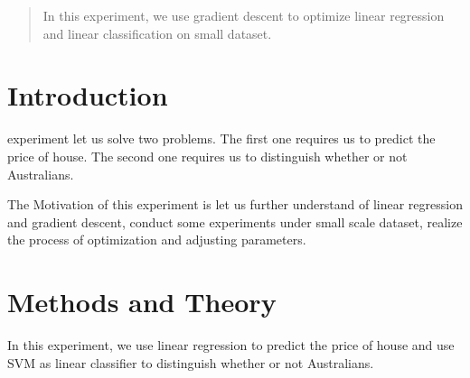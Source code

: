 \documentclass[journal, a4paper]{IEEEtran}
\begin{document}
\begin{abstract}
    In this experiment, we use gradient descent to optimize linear regression and linear classification on small dataset. 
\end{abstract}

\section{Introduction}
 experiment let us solve two problems. 
The first one requires us to predict the price of house. 
The second one requires us to distinguish whether or not Australians.

The Motivation of this experiment is let us further understand of linear regression and gradient descent, conduct some experiments under small scale dataset, realize the process of optimization and adjusting parameters.



\section{Methods and Theory}
In this experiment, we use linear regression to predict the price of house and use SVM as linear classifier to distinguish whether or not Australians.
\end{document}
